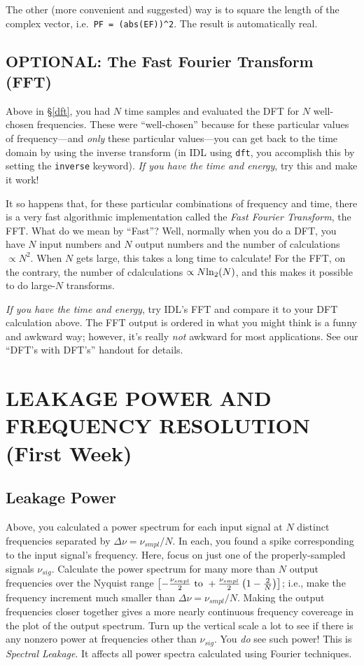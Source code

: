 \documentclass[11pt,preprint]{aastex}
\begin{document}
The other (more convenient and suggested) way is to square the length of
the complex vector, i.e.\ \verb$PF = (abs(EF))^2$. The result is
automatically real.

\subsection{OPTIONAL: The Fast Fourier Transform (FFT)} \label{fft}

Above in \S \ref{dft}, you had $N$ time samples and evaluated the DFT
for $N$ well-chosen frequencies. These were ``well-chosen'' because for
these particular values of frequency---and {\it only} these particular
values---you can get back to the time domain by using the inverse
transform (in IDL using {\tt dft}, you accomplish this by setting the
{\tt inverse} keyword). {\it If you have the time and energy}, try this
and make it work!

It so happens that, for these particular combinations of frequency and
time, there is a very fast algorithmic implementation called the {\it
  Fast Fourier Transform}, the FFT. What do we mean by ``Fast''? Well,
normally when you do a DFT, you have $N$ input numbers and $N$ output
numbers and the number of calculations $\propto N^2$. When $N$ gets large,
this takes a long time to calculate! For the FFT, on the contrary, the
number of cdalculations $\propto N {\rm ln}_2(N)$, and this makes it
possible to do large-$N$ transforms. 

{\it If you have the time and energy}, try IDL's FFT and compare it to
your DFT calculation above. The FFT output is ordered in what you might
think is a funny and awkward way; however, it's really {\it not} awkward
for most applications. See our ``DFT's with DFT's'' handout for details.

\section{ LEAKAGE POWER AND FREQUENCY RESOLUTION (First Week)} \label{leakage}

\subsection{Leakage Power}

Above, you calculated a power spectrum for each input signal at $N$
distinct frequencies separated by $\Delta \nu = \nu_{smpl}/N$. In each,
you found a spike corresponding to the input signal's frequency. Here,
focus on just one of the properly-sampled signals $\nu_{sig}$. Calculate
the power spectrum for many more than $N$ output frequencies over the
Nyquist range $\left[-{\nu_{smpl} \over 2} \ {\rm to}\ +{\nu_{smpl}
\over 2} \left( 1 - {2 \over N} \right)\right]$; i.e., make the
frequency increment much smaller than $\Delta \nu = \nu_{smpl}/N$.
Making the output frequencies closer together gives a more nearly
continuous frequency covereage in the plot of the output spectrum.  Turn
up the vertical scale a lot to see if there is any nonzero power at
frequencies other than $\nu_{sig}$.  You {\it do} see such power! This
is {\it Spectral Leakage}. It affects all power spectra calculated using
Fourier techniques. 
\end{document}
